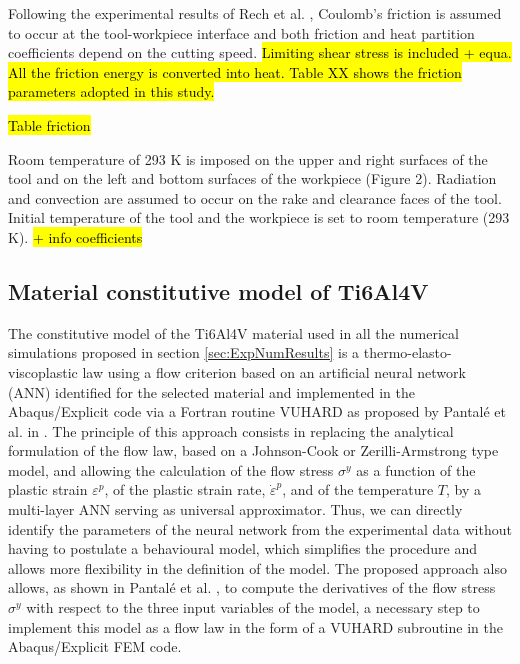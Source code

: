 \documentclass[final,5p,times,twocolumn]{elsarticle}
\begin{document}
Following the experimental results of Rech et al. \cite{rech_characterisation_2013}, Coulomb's friction is assumed to occur at the tool-workpiece interface and both friction and heat partition coefficients depend on the cutting speed. \hl{Limiting shear stress is included + equa. All the friction energy is converted into heat. Table XX shows the friction parameters adopted in this study.}

%
\hl{Table friction}
%

Room temperature of 293 K is imposed on the upper and right surfaces of the tool and on the left and bottom surfaces of the workpiece (Figure 2). Radiation and convection are assumed to occur on the rake and clearance faces of the tool. Initial temperature of the tool and the workpiece is set to room temperature (293 K). \hl{+ info coefficients}

\subsection{Material constitutive model of Ti6Al4V}

The constitutive model of the Ti6Al4V material used in all the numerical simulations proposed in section \ref{sec:ExpNumResults} is a thermo-elasto-viscoplastic law using a flow criterion based on an artificial neural network (ANN) identified for the selected material and implemented in the Abaqus/Explicit code via a Fortran routine VUHARD as proposed by Pantalé et al. in \cite{pantale_efficient_2022}.
The principle of this approach consists in replacing the analytical formulation of the flow law, based on a Johnson-Cook or Zerilli-Armstrong type model, and allowing the calculation of the flow stress $\sigma^y$ as a function of the plastic strain $\varepsilon^p$, of the plastic strain rate, ${\dot{\varepsilon}}^p$, and of the temperature $T$, by a multi-layer ANN serving as universal approximator. Thus, we can directly identify the parameters of the neural network from the experimental data without having to postulate a behavioural model, which simplifies the procedure and allows more flexibility in the definition of the model.
The proposed approach also allows, as shown in Pantalé et al. \cite{pantale_efficient_2022}, to compute the derivatives of the flow stress $\sigma^y$ with respect to the three input variables of the model, a necessary step to implement this model as a flow law in the form of a VUHARD subroutine in the Abaqus/Explicit FEM code.
\end{document}
